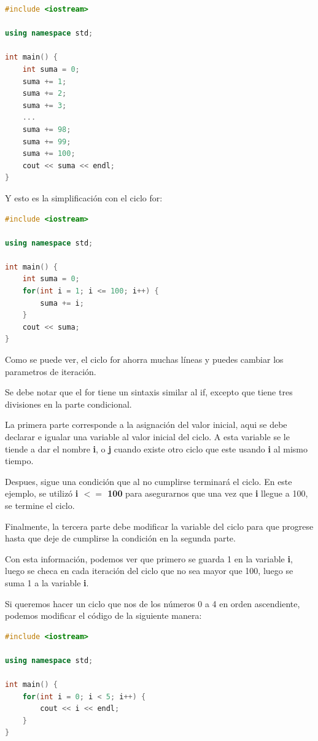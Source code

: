 \documentclass{article}
\begin{document}
\begin{lstlisting}[language=C++, caption=Suma línea por línea]
#include <iostream>

using namespace std;

int main() {
    int suma = 0;
    suma += 1;
    suma += 2;
    suma += 3;
    ...
    suma += 98;
    suma += 99;
    suma += 100;
    cout << suma << endl;
}
\end{lstlisting}

Y esto es la simplificación con el ciclo for:

\begin{lstlisting}[language=C++, caption=Suma con ciclo for]
#include <iostream>

using namespace std;

int main() {
    int suma = 0;
    for(int i = 1; i <= 100; i++) {
        suma += i;
    }
    cout << suma;
}
\end{lstlisting}

Como se puede ver, el ciclo for ahorra muchas líneas y puedes cambiar los parametros de iteración.

Se debe notar que el for tiene un sintaxis similar al if, excepto que tiene tres divisiones en la parte condicional.

La primera parte corresponde a la asignación del valor inicial, aqui se debe declarar e igualar una variable al valor inicial del ciclo. A esta variable se le tiende a dar el nombre \textbf{i}, o \textbf{j} cuando existe otro ciclo que este usando \textbf{i} al mismo tiempo.

Despues, sigue una condición que al no cumplirse terminará el ciclo. En este ejemplo, se utilizó \textbf{i $<=$ 100} para asegurarnos que una vez que \textbf{i} llegue a 100, se termine el ciclo.

Finalmente, la tercera parte debe modificar la variable del ciclo para que progrese hasta que deje de cumplirse la condición en la segunda parte.

Con esta información, podemos ver que primero se guarda 1 en la variable \textbf{i}, luego se checa en cada iteración del ciclo que no sea mayor que 100, luego se suma 1 a la variable \textbf{i}.

Si queremos hacer un ciclo que nos de los números 0 a 4 en orden ascendiente, podemos modificar el código de la siguiente manera:

\begin{lstlisting}[language=C++, caption=Ciclo for]
#include <iostream>

using namespace std;

int main() {
    for(int i = 0; i < 5; i++) {
        cout << i << endl;
    }
}
\end{lstlisting}
\end{document}
